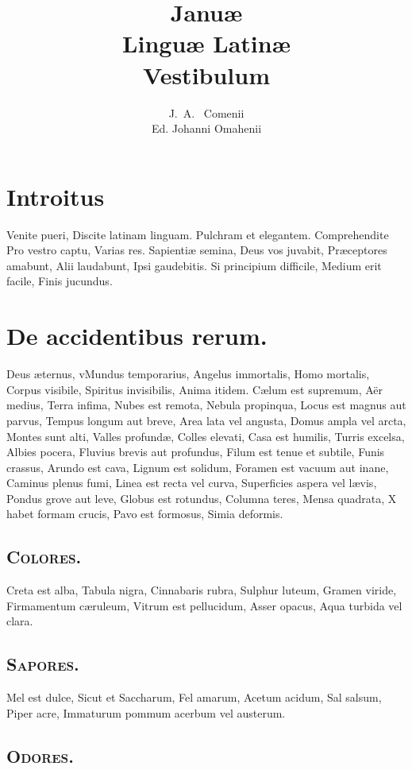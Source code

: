 \documentclass[12pt, twocolumn]{memoir}
\author{J.~A.~ Comenii\\
\small{Ed. Johanni Omahenii}}
\title{Januæ\\
Linguæ Latinæ\\
Vestibulum}
\begin{document}
\maketitle

\chapter{Introitus}
Venite pueri,
Discite latinam linguam.
Pulchram et elegantem.
Comprehendite
Pro vestro captu,
Varias res.
Sapientiæ semina,
Deus vos juvabit,
Præceptores amabunt,
Alii laudabunt,
Ipsi gaudebitis.
Si principium difficile,
Medium erit facile,
Finis jucundus.

\chapter{De accidentibus rerum.}

Deus æternus,
vMundus temporarius,
Angelus immortalis,
Homo mortalis,
Corpus visibile,
Spiritus invisibilis,
Anima itidem.
Cælum est supremum,
Aër medius,
Terra infima,
Nubes est remota,
Nebula propinqua,
Locus est magnus aut parvus,
Tempus longum aut breve,
Area lata vel angusta,
Domus ampla vel arcta,
Montes sunt alti,
Valles profundæ,
Colles elevati,
Casa est humilis,
Turris excelsa,
Albies pocera,
Fluvius brevis aut profundus,
Filum est tenue et subtile,
Funis crassus,
Arundo est cava,
Lignum est solidum,
Foramen est vacuum aut inane,
Caminus plenus fumi,
Linea est recta vel curva,
Superficies aspera vel lævis,
Pondus grove aut leve,
Globus est rotundus,
Columna teres,
Mensa quadrata,
X habet formam crucis,
Pavo est formosus,
Simia deformis.

\section*{\textsc{Colores.}}

Creta est alba,
Tabula nigra,
Cinnabaris rubra,
Sulphur luteum,
Gramen viride,
Firmamentum cæruleum,
Vitrum est pellucidum,
Asser opacus,
Aqua turbida vel clara.

\section*{\textsc{Sapores.}}

Mel est dulce,
Sicut et Saccharum,
Fel amarum,
Acetum acidum,
Sal salsum,
Piper acre,
Immaturum pommum acerbum vel austerum.

\section*{\textsc{Odores.}}
\end{document}
